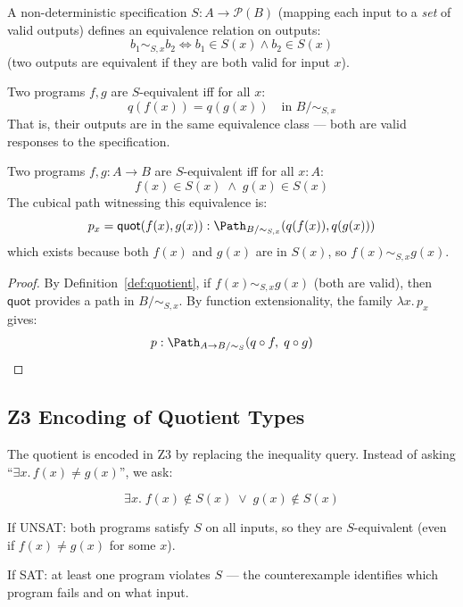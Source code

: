 \begin{definition}
\label{def:nondet-spec}
A non-deterministic specification $S : A \to \mathcal{P}(B)$ (mapping
each input to a \emph{set} of valid outputs) defines an equivalence
relation on outputs:
\[
  b_1 \sim_{S,x} b_2 \iff b_1 \in S(x) \land b_2 \in S(x)
\]
(two outputs are equivalent if they are both valid for input $x$).

Two programs $f, g$ are $S$-equivalent iff for all $x$:
\[
  q(f(x)) = q(g(x)) \quad \text{in } B / {\sim_{S,x}}
\]
That is, their outputs are in the same equivalence class --- both
are valid responses to the specification.
\end{definition}

\begin{theorem}
\label{thm:nondet-equiv}
Two programs $f, g : A \to B$ are $S$-equivalent iff for all $x : A$:
\[
  f(x) \in S(x) \;\land\; g(x) \in S(x)
\]
The cubical path witnessing this equivalence is:
\[
  p_x = \mathsf{quot}(f(x), g(x)) : \Path_{B/{\sim_{S,x}}}(q(f(x)), q(g(x)))
\]
which exists because both $f(x)$ and $g(x)$ are in $S(x)$, so
$f(x) \sim_{S,x} g(x)$.
\end{theorem}

\begin{proof}
By Definition~\ref{def:quotient}, if $f(x) \sim_{S,x} g(x)$ (both
are valid), then $\mathsf{quot}$ provides a path in $B / {\sim_{S,x}}$.
By function extensionality, the family $\lambda x.\, p_x$ gives:
\[
  p : \Path_{A \to B/{\sim_S}}(q \circ f, \; q \circ g)
\]
\end{proof}

\subsection{Z3 Encoding of Quotient Types}

The quotient is encoded in Z3 by replacing the inequality query.
Instead of asking ``$\exists x.\, f(x) \neq g(x)$'', we ask:

\[
  \exists x.\; f(x) \notin S(x) \;\lor\; g(x) \notin S(x)
\]

If UNSAT: both programs satisfy $S$ on all inputs, so they are
$S$-equivalent (even if $f(x) \neq g(x)$ for some $x$).

If SAT: at least one program violates $S$ --- the counterexample
identifies which program fails and on what input.

